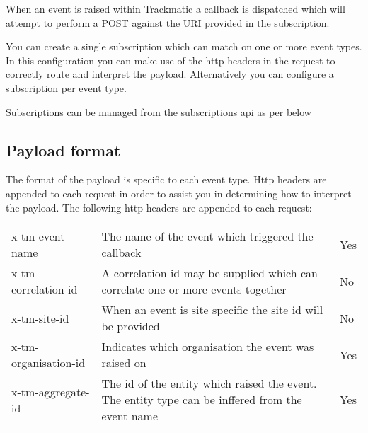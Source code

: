 \documentclass[letterpaper,10pt,english]{sphinxmanual}
\begin{document}
\begin{sphinxVerbatim}[commandchars=\\\{\}]
  
  
  
  \PYG{p}{[}
 \PYG{p}{]}
\end{sphinxVerbatim}

When an event is raised within Trackmatic a callback is dispatched which will attempt to perform a POST against the URI provided in the subscription.

You can create a single subscription which can match on one or more event types. In this configuration you can make use of the http headers in the request to correctly route and interpret the payload. Alternatively you can configure a subscription per event type.

Subscriptions can be managed from the subscriptions api as per below



\subsection{Payload format}
\label{\detokenize{webhooks/web-hooks:payload-format}}
The format of the payload is specific to each event type. Http headers are appended to each request in order to assist you in determining how to interpret the payload. The following http headers are appended to each request:

\noindent\begin{tabulary}{\linewidth}{|L|L|L|}
\hline
{}\relax &\relax &\relax \\
\hline
x-tm-event-name
&
The name of the event which triggered the callback
&
Yes
\\
\hline
x-tm-correlation-id
&
A correlation id may be supplied which can correlate one or more events together
&
No
\\
\hline
x-tm-site-id
&
When an event is site specific the site id will be provided
&
No
\\
\hline
x-tm-organisation-id
&
Indicates which organisation the event was raised on
&
Yes
\\
\hline
x-tm-aggregate-id
&
The id of the entity which raised the event. The entity type can be inffered from the event name
&
Yes
\\
\hline\end{tabulary}
\end{document}
